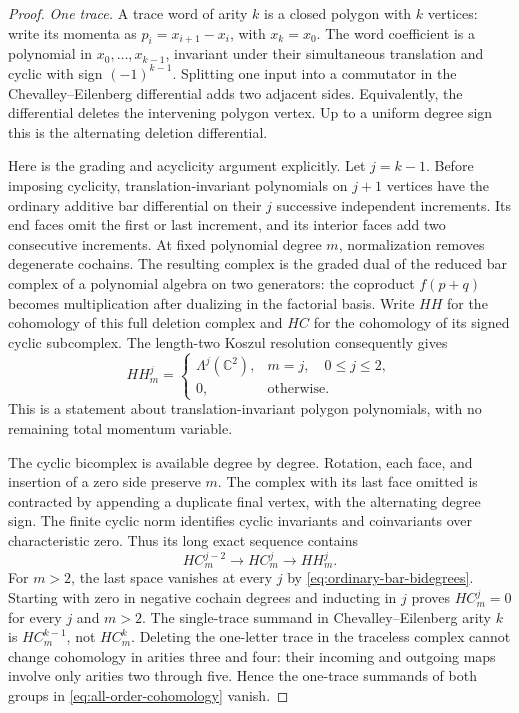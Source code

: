 \begin{proof}
\emph{One trace.}
A trace word of arity $k$ is a closed polygon with $k$ vertices:
write its momenta as $p_i=x_{i+1}-x_i$, with $x_k=x_0$.
The word coefficient is a polynomial in $x_0,\ldots,x_{k-1}$,
invariant under their simultaneous translation and cyclic with sign
$(-1)^{k-1}$.  Splitting one input into a commutator in the
Chevalley--Eilenberg differential adds two adjacent sides.  Equivalently,
the differential deletes the intervening polygon vertex.  Up to a
uniform degree sign this is the alternating deletion differential.

Here is the grading and acyclicity argument explicitly.  Let $j=k-1$.
Before imposing cyclicity, translation-invariant polynomials on
$j+1$ vertices have the ordinary additive bar differential on their
$j$ successive independent increments.  Its end faces omit the first
or last increment, and its interior faces add two consecutive
increments.  At fixed polynomial degree $m$, normalization removes
degenerate cochains.  The resulting complex is the graded dual of the
reduced bar complex of a polynomial algebra on two generators:
the coproduct $f(p+q)$ becomes multiplication after dualizing in the
factorial basis.  Write $HH$ for the cohomology of this full deletion
complex and $HC$ for the cohomology of its signed cyclic subcomplex.
The length-two Koszul resolution consequently gives
\begin{equation}
 HH^j_m=
 \begin{cases}
  \Lambda^j(\mathbb C^2),&m=j,\quad 0\le j\le2,\\
  0,&\text{otherwise}.
 \end{cases}
 \label{eq:ordinary-bar-bidegrees}
\end{equation}
This is a statement about translation-invariant polygon polynomials,
with no remaining total momentum variable.

The cyclic bicomplex is available degree by degree.  Rotation, each
face, and insertion of a zero side preserve $m$.  The complex with
its last face omitted is contracted by appending a duplicate final
vertex, with the alternating degree sign.  The finite cyclic norm
identifies cyclic invariants and coinvariants over characteristic
zero.  Thus its long exact sequence contains
\begin{equation}
  HC^{j-2}_m\longrightarrow HC^j_m\longrightarrow HH^j_m.
  \label{eq:polygon-cyclic-sequence}
\end{equation}
For $m>2$, the last space vanishes at every $j$ by
\eqref{eq:ordinary-bar-bidegrees}.  Starting with zero in negative
cochain degrees and inducting in $j$ proves $HC^j_m=0$ for every
$j$ and $m>2$.  The single-trace summand in Chevalley--Eilenberg
arity $k$ is $HC^{k-1}_m$, not $HC^k_m$.
Deleting the one-letter trace in the traceless complex cannot change
cohomology in arities three and four: their incoming and outgoing
maps involve only arities two through five.  Hence the one-trace
summands of both groups in \eqref{eq:all-order-cohomology} vanish.


\end{proof}
